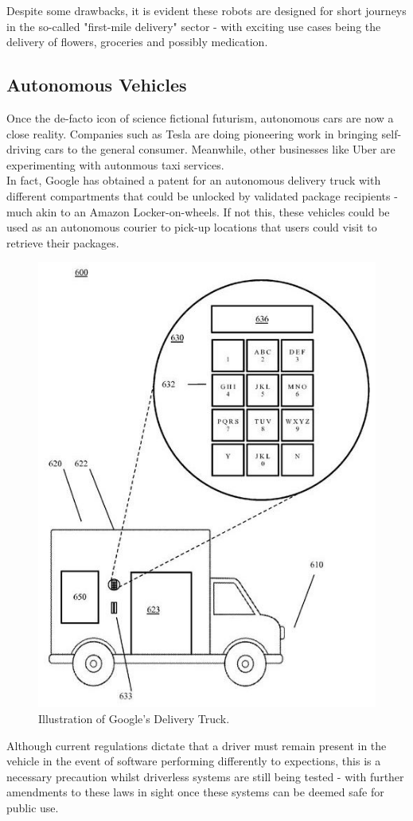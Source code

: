 \documentclass[a4paper,11pt,titlepage]{report}
\begin{document}
Despite some drawbacks, it is evident these robots are designed for short journeys in the so-called "first-mile delivery" sector - with exciting use cases being the delivery of flowers, groceries and possibly medication.

\subsection{Autonomous Vehicles}
Once the de-facto icon of science fictional futurism, autonomous cars are now a close reality. Companies such as Tesla are doing pioneering work in bringing self-driving cars\cite{Tesla2018} to the general consumer. Meanwhile, other businesses like Uber are experimenting with autonmous taxi services\cite{Gibbs2017}. \\

In fact, Google has obtained a patent for an autonomous delivery truck \cite{Hall-Geisler} with different compartments that could be unlocked by validated package recipients - much akin to an Amazon Locker-on-wheels. If not this, these vehicles could be used as an autonomous courier to pick-up locations that users could visit to retrieve their packages.

\begin{figure}[!hbpt]
  \center
  \includegraphics[width=0.4\linewidth]{img/google_truck_patent.jpeg}
  \caption{Illustration of Google's Delivery Truck. \cite{google_truck_patent}}
  \label{fig:google_truck_patent}
\end{figure}

Although current regulations dictate that a driver must remain present in the vehicle in the event of software performing differently to expections, this is a necessary precaution whilst driverless systems are still being tested - with further amendments to these laws in sight once these systems can be deemed safe for public use. \cite{Bowcott2017}
\end{document}
